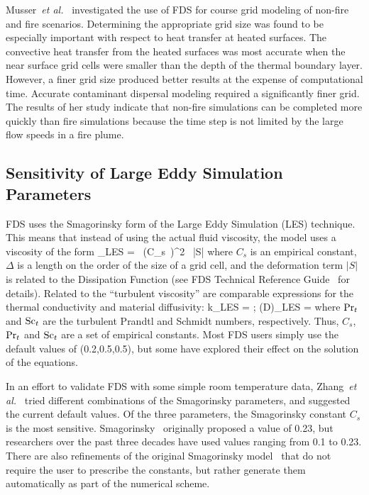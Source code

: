 \documentclass[11pt]{book}
\begin{document}
Musser~{\em et  al.}~\cite{Musser:1} investigated  the use of  FDS for course grid  modeling of non-fire and fire  scenarios. Determining the
appropriate  grid  size was  found  to  be  especially important  with respect  to heat  transfer  at heated  surfaces.  The convective  heat
transfer  from the  heated surfaces  was most  accurate when  the near surface grid cells were smaller than the depth of the thermal boundary layer.
However, a  finer grid  size  produced better  results at  the expense of computational time. Accurate contaminant dispersal modeling required a
significantly finer grid. The results of her study indicate that  non-fire simulations  can be  completed more  quickly  than fire simulations
because  the time  step is not  limited by the  large flow speeds in a fire plume.


\subsection{Sensitivity of Large Eddy Simulation Parameters}

FDS  uses the  Smagorinsky form  of  the Large  Eddy Simulation  (LES) technique.  This  means  that   instead  of  using  the  actual  fluid
viscosity, the model uses a viscosity of the form
\be
  \mu_{\hbox{\tiny LES}} =  \rho \,  (C_s\, \Delta)^2  \, |S|
\ee
where $C_s$  is an empirical constant, $\Delta$ is a length on the order of the size of a grid  cell,  and  the  deformation   term  $|S|$  is
related  to  the Dissipation Function (see FDS Technical Reference Guide~\cite{FDS_Math_Guide} for details). Related to the ``turbulent  viscosity'' are  comparable
expressions  for  the thermal conductivity  and  material diffusivity:  \be  k_{\hbox{\tiny LES}}  = 
\quad   ;  \quad  (\rho D)_{\hbox{\tiny  LES}}  =  \ee  where $\hbox{Pr}_t$ and $\hbox{Sc}_t$ are the turbulent Prandtl and Schmidt numbers, respectively.
Thus, $C_s$, $\hbox{Pr}_t$  and $\hbox{Sc}_t$ are  a set  of  empirical constants.  Most  FDS users
simply use  the default values  of (0.2,0.5,0.5), but some have  explored their effect on the solution of the equations.

In an effort  to validate FDS with some  simple room temperature data, Zhang~{\em et al.}~\cite{Zhang:2}  tried different combinations of the
Smagorinsky parameters,  and suggested the current  default values. Of the  three parameters,  the  Smagorinsky constant  $C_s$  is the  most
sensitive.   Smagorinsky~\cite{Smagorinsky:1}  originally  proposed  a value of 0.23,  but researchers over the past  three decades have used values
ranging  from 0.1  to 0.23. There  are also refinements  of the original  Smagorinsky  model~\cite{Deardorff:1,Germano:1,Lilly:1} that do  not
require the  user  to  prescribe  the constants,  but  rather generate them automatically as part of the numerical scheme.
\end{document}
